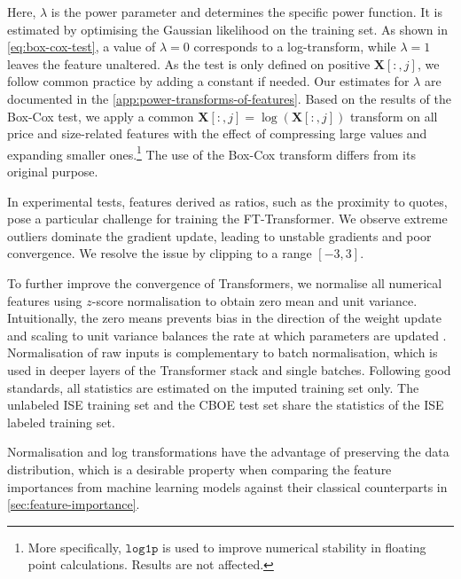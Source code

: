 Here, $\lambda$ is the power parameter and determines the specific power function. It is estimated by optimising the Gaussian likelihood on the training set. As shown in \cref{eq:box-cox-test}, a value of $\lambda=0$ corresponds to a log-transform, while $\lambda=1$ leaves the feature unaltered. As the test is only defined on positive $\mathbf{X}\left[:,j\right]$, we follow common practice by adding a constant if needed. Our estimates for $\lambda$ are documented in the \cref{app:power-transforms-of-features}. Based on the results of the Box-Cox test, we apply a common $\mathbf{X}\left[:,j\right]=\log(\mathbf{X}\left[:,j\right])$ transform on all price and size-related features with the effect of compressing large values and expanding smaller ones.\footnote{More specifically, $\mathtt{log1p}$ is used to improve numerical stability in floating point calculations. Results are not affected.} The use of the Box-Cox transform differs from its original purpose. 

In experimental tests, features derived as ratios, such as the proximity to quotes, pose a particular challenge for training the FT-Transformer. We observe extreme outliers dominate the gradient update, leading to unstable gradients and poor convergence. We resolve the issue by clipping to a range $[-3,3]$.

To further improve the convergence of Transformers, we normalise all numerical features using $z$-score normalisation to obtain zero mean and unit variance. Intuitionally, the zero means prevents bias in the direction of the weight update and scaling to unit variance balances the rate at which parameters are updated \autocite[][8]{lecunEfficientBackProp2012}. Normalisation of raw inputs is complementary to batch normalisation, which is used in deeper layers of the Transformer stack and single batches. Following good standards, all statistics are estimated on the imputed training set only. The unlabeled \gls{ISE} training set and the \gls{CBOE} test set share the statistics of the \gls{ISE} labeled training set.

Normalisation and log transformations have the advantage of preserving the data distribution, which is a desirable property when comparing the feature importances from machine learning models against their classical counterparts in \cref{sec:feature-importance}.

